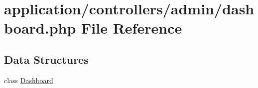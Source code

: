 \hypertarget{controllers_2admin_2dashboard_8php}{\section{application/controllers/admin/dashboard.php File Reference}
\label{controllers_2admin_2dashboard_8php}
}
\subsection*{Data Structures}
\begin{DoxyCompactItemize}
\item 
class \hyperlink{class_dashboard}{Dashboard}
\end{DoxyCompactItemize}
